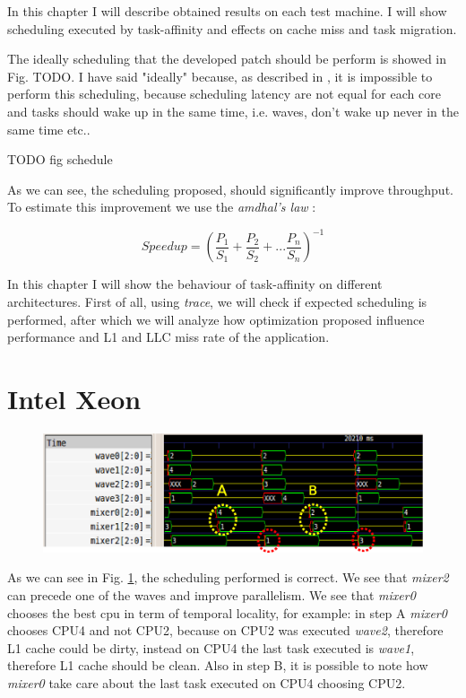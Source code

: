 In this chapter I will describe obtained results on each test machine. I will show scheduling executed by task-affinity and effects on cache miss and 
task migration. 

The ideally scheduling that the developed patch should be perform is showed in Fig. TODO. I have said "ideally" because, as described in \cite{lcs}, it is 
impossible to perform this scheduling, because scheduling latency are not equal for each core and tasks should wake up in the same time, i.e. waves, don't
wake up never in the same time etc.. 

TODO fig schedule

As we can see, the scheduling proposed, should significantly improve throughput. To estimate this improvement we use the \textit{amdhal's law} \cite{lcs}:

\begin{equation}
       Speedup = (\frac{P_{1}}{S_{1}} + \frac{P_{2}}{S_{2}} + ... \frac{P_{n}}{S_{n}})^{-1} 
\label{eq:amdhal}
\end{equation}

In this chapter I will show the behaviour of task-affinity on different architectures. First of all, using \textit{trace}, we will check if expected 
scheduling is performed, after which we will analyze how optimization proposed influence performance and L1 and LLC miss rate of the application. 

\section{Intel Xeon}

\begin{figure}[htbp]
\centering
\includegraphics[width=\widefigure]{images/results_xeon/final_xeon.eps}
\caption{}
\label{fig:trace_xeon}
\end{figure}

As we can see in Fig. \ref{fig:trace_xeon}, the scheduling performed is correct. We see that \textit{mixer2} can precede one of the waves and improve 
parallelism. We see that \textit{mixer0} chooses the best cpu in term of temporal locality, for example: in step A \textit{mixer0} chooses CPU4 and not 
CPU2, because on CPU2 was executed \textit{wave2}, therefore L1 cache could be dirty, instead on CPU4 the last task executed is \textit{wave1}, therefore 
L1 cache should be clean. Also in step B, it is possible to note how \textit{mixer0} take care about the last task executed on CPU4 choosing CPU2.

